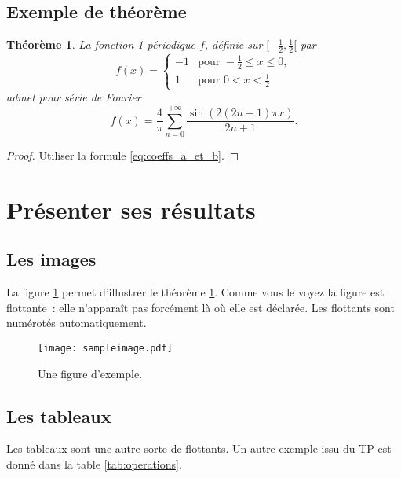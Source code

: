 \documentclass[12pt]{book}
\newtheorem{theorem}{Théorème} %
\begin{document}
\subsection{Exemple de théorème}

\begin{theorem}
\label{th:Fourier}
La fonction 1-périodique $f$, définie sur $[-\frac12, \frac12[$ par
\begin{equation*}
    f(x) = \begin{cases}
    -1 & \text{pour } -\frac12 \leq x \leq 0, \\
    1 & \text{pour } 0 < x < \frac12
    \end{cases}
\end{equation*}
admet pour série de Fourier
\begin{equation*}
    f(x) = \frac4\pi \sum_{n=0}^{+\infty} \frac{\sin(2(2n+1)\pi x)}{2n+1}.
\end{equation*}
\end{theorem}

\begin{proof}
Utiliser la formule \eqref{eq:coeffs_a_et_b}.
\end{proof}

\section{Présenter ses résultats}

\subsection{Les images}

La figure \ref{fig:exemple} permet d'illustrer le théorème \ref{th:Fourier}.
Comme vous le voyez la figure est flottante~: elle n'apparaît pas forcément là où elle est déclarée.
Les flottants sont numérotés automatiquement.

\begin{figure}[t]
\centering
\texttt{[image: sampleimage.pdf]}
\caption{\label{fig:exemple}Une figure d'exemple.}
\end{figure}

\subsection{Les tableaux}

Les tableaux sont une autre sorte de flottants. Un autre exemple issu du TP est donné  dans la table \ref{tab:operations}.
\end{document}
